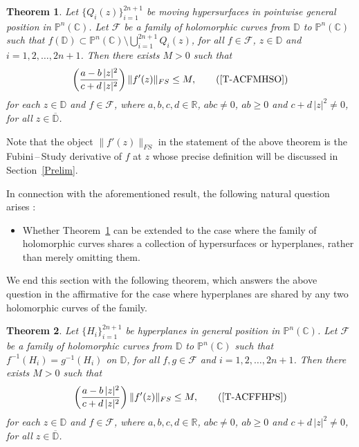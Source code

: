 \documentclass[11pt, reqno]{amsart}
\newtheorem{theorem}{Theorem}[section]
\theoremstyle{definition}
\theoremstyle{remark}
\numberwithin{equation}{section}
\begin{document}
\begin{theorem}\label{T-ACFMHSO}
Let $\{Q_i(z)\}_{i=1}^{2n+1}$ be moving hypersurfaces in pointwise general position in $\mathbb P^n(\mathbb C)$. Let 
$\mathcal F$ be a family of holomorphic curves from $\mathbb D$ to $\mathbb P^n(\mathbb C)$ such that $f(\mathbb D)\subset \mathbb P^n(\mathbb C)\setminus \displaystyle\bigcup_{i=1}^{2n+1} Q_i(z)$, 
for all $f\in\mathcal F$, $z\in\mathbb D$ and $i=1,2,\dots,2n+1$. Then there exists $M>0$ such that 
\begin{align*}\left(\frac{a-b\,|z|^2}{c+d\,|z|^2}\right)\|f'(z)\|_{FS}\leq M, \label{ACFMHSO} \tag{\ref*{T-ACFMHSO}} \end{align*}
for each $z\in \mathbb D$ and $f\in\mathcal F$, where $a,b,c,d\in\mathbb R$, $abc\neq 0$, $ab\geq 0$ and $c+d\,|z|^2\neq0$, for all $z\in\overline{\mathbb D}$.
\end{theorem}

Note that the object $\|f'(z)\|_{FS}$ in the statement of the above theorem is the Fubini\,--\,Study derivative of $f$ at $z$ whose precise definition will be discussed in Section~\ref{Prelim}.
\smallskip

In connection with the aforementioned result, the following natural question arises :
\begin{itemize}
\item Whether Theorem~\ref{T-ACFMHSO} can be extended to the case where the family of holomorphic curves shares a collection of hypersurfaces or hyperplanes, rather than merely omitting them.
\end{itemize}

We end this section with the following theorem, which answers the above question in the affirmative for the case where hyperplanes are shared by any two holomorphic curves of the family.

\begin{theorem}\label{T-ACFFHPS}
Let $\{H_i\}_{i=1}^{2n+1}$ be hyperplanes in general position in $\mathbb P^n(\mathbb C)$. Let $\mathcal F$ be a family of 
holomorphic curves from $\mathbb D$ to $\mathbb P^n(\mathbb C)$ such that $f^{-1}(H_i)=g^{-1}(H_i)$ on $\mathbb D$, for all 
$f,g\in\mathcal F$ and $i=1,2,\dots,2n+1$. Then there exists $M>0$ such that 
\begin{align*}\left(\frac{a-b\,|z|^2}{c+d\,|z|^2}\right)\|f'(z)\|_{FS}\leq M, \label{ACFFHPS} \tag{\ref*{T-ACFFHPS}} \end{align*}
for each $z\in \mathbb D$ and $f\in\mathcal F$, where $a,b,c,d\in\mathbb R$, $abc\neq 0$, $ab\geq 0$ and 
$c+d\,|z|^2\neq0$, for all $z\in\overline{\mathbb D}$.
\end{theorem}
\end{document}
